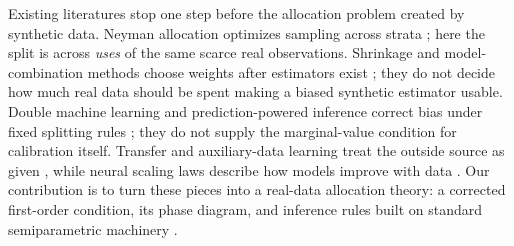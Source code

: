 Existing literatures stop one step before the allocation problem created by synthetic data. Neyman allocation optimizes sampling across strata \citep{neyman1934,cochran1977}; here the split is across \emph{uses} of the same scarce real observations. Shrinkage and model-combination methods choose weights after estimators exist \citep{stein1956,jamesstein1961,hansen2007combination}; they do not decide how much real data should be spent making a biased synthetic estimator usable. Double machine learning and prediction-powered inference correct bias under fixed splitting rules \citep{chernozhukov2018doubleml,angelopoulos2023ppi,zrnic2024crosspp}; they do not supply the marginal-value condition for calibration itself. Transfer and auxiliary-data learning treat the outside source as given \citep{panyang2010transfer,bastani2021proxy,licaili2022transfer}, while neural scaling laws describe how models improve with data \citep{kaplan2020scaling,hoffmann2022chinchilla}. Our contribution is to turn these pieces into a real-data allocation theory: a corrected first-order condition, its phase diagram, and inference rules built on standard semiparametric machinery \citep{bickelklaassenritovwellner1993,vandervaart1998asymptotic}.


